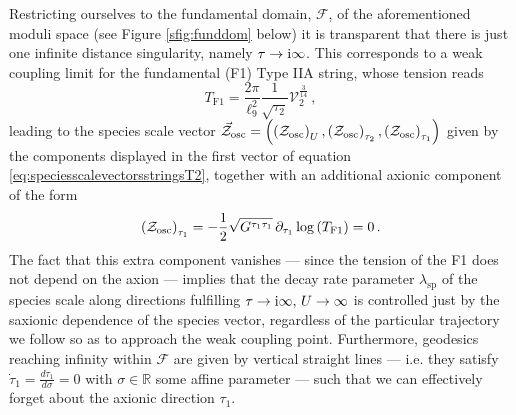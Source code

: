 Restricting ourselves to the fundamental domain, $\mathscr{F}$, of the aforementioned moduli space (see Figure \ref{sfig:funddom} below) it is transparent that there is just one infinite distance singularity, namely $\tau \to \text{i} \infty$. This corresponds to a weak coupling limit for the fundamental (F1) Type IIA string, whose tension reads
%
\begin{equation}\label{eq:IIAtension}
	T_{\text{F1}} = \frac{2\pi}{\ell_{9}^2} \frac{1}{\sqrt{\tau_2}}  \mathcal{V}_2^{\frac{3}{14}}\, ,
\end{equation}
%
leading to the species scale vector $\vec{\mathcal{Z}}_{\text{osc}} = \left(\left(\mathcal{Z}_{\rm osc}\right)_{U}, \left(\mathcal{Z}_{\rm osc}\right)_{\tau_2}, \left(\mathcal{Z}_{\rm osc}\right)_{\tau_1} \right)$ given by the components displayed in the first vector of equation \eqref{eq:speciesscalevectorsstringsT2}, together with an additional axionic component of the form
%
\begin{equation} \label{eq:chargetomassF1}
 \left(\mathcal{Z}_{\rm osc}\right)_{\tau_1} = -\frac{1}{2}\sqrt{G^{\tau_1 \tau_1}}\, \partial_{\tau_1} \log \left(T_{\text{F1}}\right) = 0 \, .%
\end{equation}
%
The fact that this extra component vanishes --- since the tension of the F1 does not depend on the axion --- implies that the decay rate parameter $\lambda_{\text{sp}}$ of the species scale along directions fulfilling $\tau \to \text{i} \infty,\, U \to \infty$ is controlled just by the saxionic dependence of the species vector, regardless of the particular trajectory we follow so as to approach the weak coupling point. Furthermore, geodesics reaching infinity within $\mathscr{F}$ are given by vertical straight lines --- i.e. they satisfy $\dot \tau_1=\frac{d\tau_1}{d\sigma}=0$ with $\sigma \in \mathbb{R}$ some affine parameter --- such that we can effectively forget about the axionic direction $\tau_1$.

